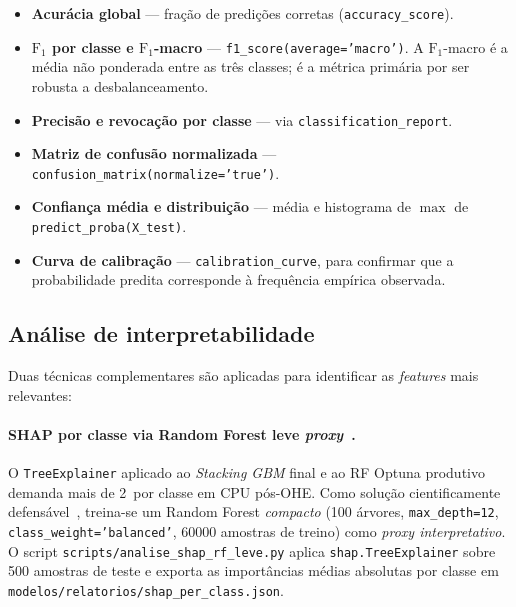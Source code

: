\begin{itemize}
  \item \textbf{Acurácia global} --- fração de predições corretas (\texttt{accuracy\_score}).
  \item \textbf{\(\text{F}_1\) por classe e \(\text{F}_1\)-macro} --- \texttt{f1\_score(average='macro')}. A \(\text{F}_1\)-macro é a média não ponderada entre as três classes; é a métrica primária por ser robusta a desbalanceamento.
  \item \textbf{Precisão e revocação por classe} --- via \texttt{classification\_report}.
  \item \textbf{Matriz de confusão normalizada} --- \texttt{confusion\_matrix(normalize='true')}.
  \item \textbf{Confiança média e distribuição} --- média e histograma de \(\max\) de \texttt{predict\_proba(X\_test)}.
  \item \textbf{Curva de calibração} --- \texttt{calibration\_curve}, para confirmar que a probabilidade predita corresponde à frequência empírica observada.
\end{itemize}

\subsection{Análise de interpretabilidade}
\label{subsec:metod_interpretabilidade}

Duas técnicas complementares são aplicadas para identificar as \emph{features} mais relevantes:

\paragraph{SHAP por classe via Random Forest leve \emph{proxy}~\cite{lundberg2017unified,lundberg2020local}.} O \texttt{TreeExplainer} aplicado ao \emph{Stacking GBM} final e ao RF Optuna produtivo demanda mais de \num{2}\, por classe em CPU pós-OHE. Como solução cientificamente defensável~\cite{lundberg2020local}, treina-se um Random Forest \emph{compacto} (100 árvores, \texttt{max\_depth=12}, \texttt{class\_weight='balanced'}, \num{60000} amostras de treino) como \emph{proxy interpretativo}. O script \texttt{scripts/analise\_shap\_rf\_leve.py} aplica \texttt{shap.TreeExplainer} sobre 500 amostras de teste e exporta as importâncias médias absolutas por classe em \texttt{modelos/relatorios/shap\_per\_class.json}.

